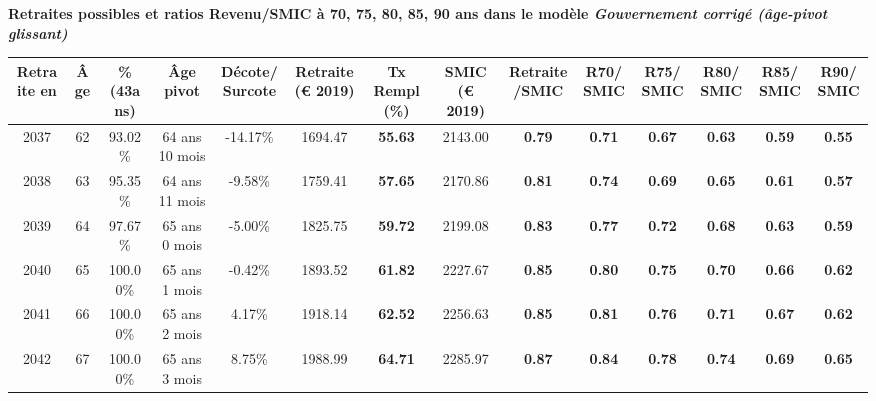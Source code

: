  \vspace{0.1cm} 
{\bf \noindent Retraites possibles et ratios Revenu/SMIC à 70, 75, 80, 85, 90 ans dans le modèle \emph{Gouvernement corrigé (âge-pivot glissant)}}  
 
\begin{adjustbox}{max width=\textwidth} 
\begin{tabular}[htb]{|c|c||c|c|c||c|c||c|c||c|c|c|c|c|} 
\hline 
 Retraite en &  Âge &  \%(43ans) &  Âge pivot &  Décote/Surcote &  Retraite (\euro{} 2019) &  Tx Rempl(\%) &  SMIC (\euro{} 2019) &  Retraite/SMIC &  R70/SMIC &  R75/SMIC &  R80/SMIC &  R85/SMIC &  R90/SMIC \\ 
\hline \hline 
 2037 &  62 &  93.02\% &  64 ans 10 mois &  -14.17\% &  1694.47 &  {\bf 55.63} &  2143.00 &  {\bf {\color{red} 0.79}} &  {\bf {\color{red} 0.71}} &  {\bf {\color{red} 0.67}} &  {\bf {\color{red} 0.63}} &  {\bf {\color{red} 0.59}} &  {\bf {\color{red} 0.55}} \\ 
\hline 
 2038 &  63 &  95.35\% &  64 ans 11 mois &  -9.58\% &  1759.41 &  {\bf 57.65} &  2170.86 &  {\bf {\color{red} 0.81}} &  {\bf {\color{red} 0.74}} &  {\bf {\color{red} 0.69}} &  {\bf {\color{red} 0.65}} &  {\bf {\color{red} 0.61}} &  {\bf {\color{red} 0.57}} \\ 
\hline 
 2039 &  64 &  97.67\% &  65 ans 0 mois &  -5.00\% &  1825.75 &  {\bf 59.72} &  2199.08 &  {\bf {\color{red} 0.83}} &  {\bf {\color{red} 0.77}} &  {\bf {\color{red} 0.72}} &  {\bf {\color{red} 0.68}} &  {\bf {\color{red} 0.63}} &  {\bf {\color{red} 0.59}} \\ 
\hline 
 2040 &  65 &  100.00\% &  65 ans 1 mois &  -0.42\% &  1893.52 &  {\bf 61.82} &  2227.67 &  {\bf {\color{red} 0.85}} &  {\bf {\color{red} 0.80}} &  {\bf {\color{red} 0.75}} &  {\bf {\color{red} 0.70}} &  {\bf {\color{red} 0.66}} &  {\bf {\color{red} 0.62}} \\ 
\hline 
 2041 &  66 &  100.00\% &  65 ans 2 mois &  4.17\% &  1918.14 &  {\bf 62.52} &  2256.63 &  {\bf {\color{red} 0.85}} &  {\bf {\color{red} 0.81}} &  {\bf {\color{red} 0.76}} &  {\bf {\color{red} 0.71}} &  {\bf {\color{red} 0.67}} &  {\bf {\color{red} 0.62}} \\ 
\hline 
 2042 &  67 &  100.00\% &  65 ans 3 mois &  8.75\% &  1988.99 &  {\bf 64.71} &  2285.97 &  {\bf {\color{red} 0.87}} &  {\bf {\color{red} 0.84}} &  {\bf {\color{red} 0.78}} &  {\bf {\color{red} 0.74}} &  {\bf {\color{red} 0.69}} &  {\bf {\color{red} 0.65}} \\ 
\hline 
\hline 
\end{tabular} 
\end{adjustbox} 
 
